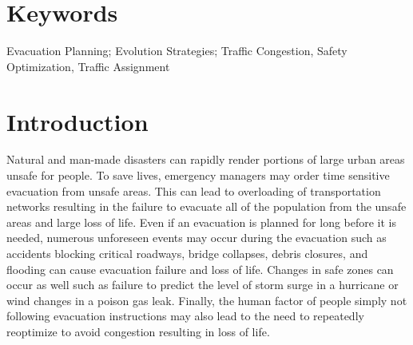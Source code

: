 \documentclass{sig-alternate-05-2015}
\begin{document}
\maketitle

\begin{abstract}
In an urban disaster it is important to efficiently evacuate people to
safety.  We use evolution strategies and a probability model to route
the population by optimizing their safety.  The algorithm is designed
to use the strengths of evolutionary computing to repeatedly optimize
an evacuation under the dynamics of a disaster such as accidents
blocking critical roadways, bridge collapses, debris closures, changes
in safety, and people not following evacuation directions.  Our model
is unconcerned with specific evacuation routes but rather evolves a
robust cloud of probabilities to represent best directions of escape.
We show that maintaining a population of diverse solutions may allow
for rapid adaptation as a disaster unfolds.  The core optimization
algorithm is tested using challenging test cases as well as real-world
data.
\end{abstract}
\section*{Keywords}
Evacuation Planning; Evolution Strategies; Traffic
Congestion, Safety Optimization, Traffic Assignment

\section{Introduction}

Natural and man-made disasters can rapidly render portions of large
urban areas unsafe for people.  To save lives, emergency managers may
order time sensitive evacuation from unsafe areas.  This can lead to
overloading of transportation networks resulting in the failure to
evacuate all of the population from the unsafe areas and large loss of
life.  Even if an evacuation is planned for long before it is needed,
numerous unforeseen events may occur during the evacuation such as
accidents blocking critical roadways, bridge collapses, debris
closures, and flooding can cause evacuation failure and loss of life.
Changes in safe zones can occur as well such as failure to predict the
level of storm surge in a hurricane or wind changes in a poison gas
leak.  Finally, the human factor of people simply not following
evacuation instructions may also lead to the need to repeatedly
reoptimize to avoid congestion resulting in loss of life.
\end{document}
